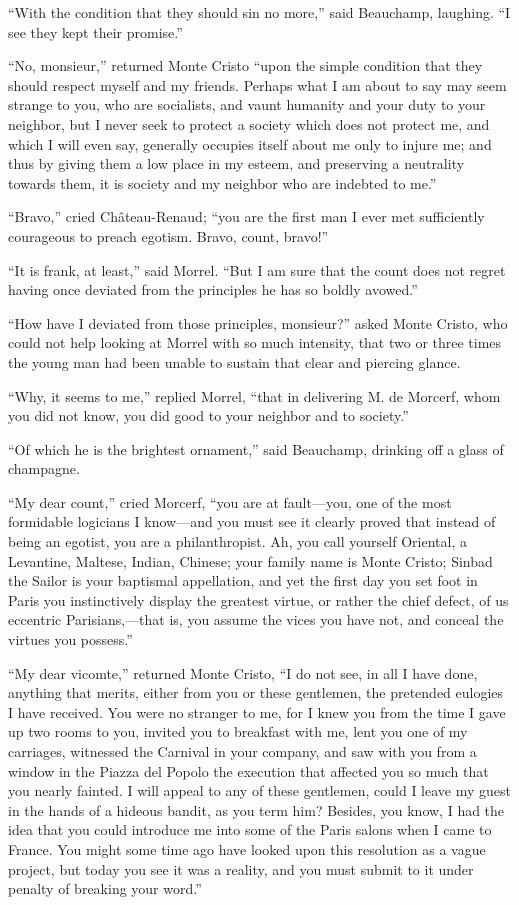 “With the condition that they should sin no more,” said Beauchamp,
laughing. “I see they kept their promise.”

“No, monsieur,” returned Monte Cristo “upon the simple condition that
they should respect myself and my friends. Perhaps what I am about to
say may seem strange to you, who are socialists, and vaunt humanity and
your duty to your neighbor, but I never seek to protect a society which
does not protect me, and which I will even say, generally occupies
itself about me only to injure me; and thus by giving them a low place
in my esteem, and preserving a neutrality towards them, it is society
and my neighbor who are indebted to me.”

“Bravo,” cried Château-Renaud; “you are the first man I ever met
sufficiently courageous to preach egotism. Bravo, count, bravo!”

“It is frank, at least,” said Morrel. “But I am sure that the count
does not regret having once deviated from the principles he has so
boldly avowed.”

“How have I deviated from those principles, monsieur?” asked Monte
Cristo, who could not help looking at Morrel with so much intensity,
that two or three times the young man had been unable to sustain that
clear and piercing glance.

“Why, it seems to me,” replied Morrel, “that in delivering M. de
Morcerf, whom you did not know, you did good to your neighbor and to
society.”

“Of which he is the brightest ornament,” said Beauchamp, drinking off a
glass of champagne.

“My dear count,” cried Morcerf, “you are at fault—you, one of the most
formidable logicians I know—and you must see it clearly proved that
instead of being an egotist, you are a philanthropist. Ah, you call
yourself Oriental, a Levantine, Maltese, Indian, Chinese; your family
name is Monte Cristo; Sinbad the Sailor is your baptismal appellation,
and yet the first day you set foot in Paris you instinctively display
the greatest virtue, or rather the chief defect, of us eccentric
Parisians,—that is, you assume the vices you have not, and conceal the
virtues you possess.”

“My dear vicomte,” returned Monte Cristo, “I do not see, in all I have
done, anything that merits, either from you or these gentlemen, the
pretended eulogies I have received. You were no stranger to me, for I
knew you from the time I gave up two rooms to you, invited you to
breakfast with me, lent you one of my carriages, witnessed the Carnival
in your company, and saw with you from a window in the Piazza del
Popolo the execution that affected you so much that you nearly fainted.
I will appeal to any of these gentlemen, could I leave my guest in the
hands of a hideous bandit, as you term him? Besides, you know, I had
the idea that you could introduce me into some of the Paris salons when
I came to France. You might some time ago have looked upon this
resolution as a vague project, but today you see it was a reality, and
you must submit to it under penalty of breaking your word.”

